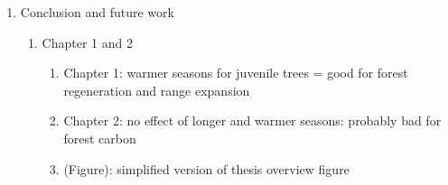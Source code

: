\documentclass{article}\usepackage[]{graphicx}\usepackage[]{xcolor}
\begin{document}
\begin{enumerate}
\begin{enumerate}
  \item R/D: weak response across species across current year predictors
    \begin{enumerate}
    \item Ball decreased growth: southernmost range reduction in future ACC
    \item Tiam: grew less with earlier SOS despite being fast growing 
    \item No consistent trend across life history strategies or wood porousness
    \item (Figure): mu plots 4 facet
    \end{enumerate}
  
  \item R/D: 2 species responded to previous year thermal season
    \begin{enumerate}
    \item Ball increase growth with previous yr condition
    \item Bnig grew more only when considering previous yr condition
    \item Maybe suggests importance of carbon allocation to storage for mature trees; blur responses
    \item (Figure): previous year conditions mu plot
    \end{enumerate}
  
  \end{enumerate}

\item Conclusion and future work
  \begin{enumerate}
  \item Chapter 1 and 2
    \begin{enumerate}
    \item Chapter 1: warmer seasons for juvenile trees = good for forest regeneration and range expansion
    \item Chapter 2: no effect of longer and warmer seasons: probably bad for forest carbon
    \item (Figure): simplified version of thesis overview figure
    \end{enumerate}

    
  \end{enumerate}

\end{enumerate}
\end{document}
